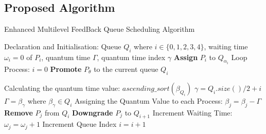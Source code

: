 \documentclass[conference]{IEEEtran}
\begin{document}
\subsection{Proposed Algorithm}
\begin{algorithm}[H]
    \caption{Enhanced Multilevel FeedBack Queue Scheduling Algorithm}
    \begin{algorithmic}[1]
    \Statex Declaration and Initialisation:
    \State Queue $Q_{i}$ where $i \in \{0, 1, 2, 3, 4\}$, waiting time $\omega_{i} = 0$ of $P_{i}$, quantum time $\Gamma$, quantum time index $\gamma$
            \State \textbf{Assign} $P_{i}$ to $Q_{\alpha_{i}}$
        \EndFor
    \Statex Loop Process:
        \State $i = 0$
                    \State \textbf{Promote} $P_{\theta}$ to the current queue $Q_{i}$
                \EndIf
            \EndFor
            
            \Statex Calculating the quantum time value:
            \State $ascending\_sort(\beta_{Q_{i}})$
            \State $\gamma = Q_{i}.size()/2 + i$
            \State $\Gamma = \beta_{\gamma}$ where $\beta_{\gamma} \in Q_{i}$
            \Statex Assigning the Quantum Value to each Process:
                \State $\beta_{j} = \beta_{j} - \Gamma$
                    \State \textbf{Remove} $P_{j}$ from $Q_{i}$
                    \State \textbf{Downgrade} $P_{j}$ to $Q_{i+1}$
                \EndIf
            \EndFor
            \Statex Increment Waiting Time:
                \State $\omega_{j} = \omega_{j} + 1$
            \EndFor
            \Statex Increment Queue Index
                \State $i = i + 1$
            \EndIf
        \EndWhile
     \EndProcedure
    \end{algorithmic}
\end{algorithm}
\end{document}

